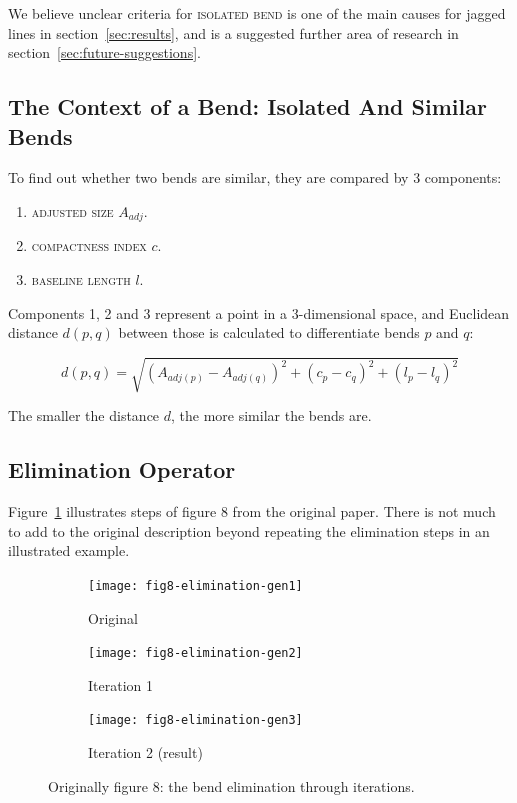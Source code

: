 \documentclass[a4paper]{article}
\begin{document}
We believe unclear criteria for \textsc{isolated bend} is one of the main
causes for jagged lines in section~\ref{sec:results}, and is a suggested
further area of research in section~\ref{sec:future-suggestions}.

\subsection{The Context of a Bend: Isolated And Similar Bends}

To find out whether two bends are similar, they are compared by 3 components:

\begin{enumerate}
  \item \textsc{adjusted size} $A_{adj}$.
  \item \textsc{compactness index} $c$.
  \item \textsc{baseline length} $l$.
\end{enumerate}

Components 1, 2 and 3 represent a point in a 3-dimensional space, and Euclidean
distance $d(p,q)$ between those is calculated to differentiate bends $p$ and
$q$:

\[
  d(p,q) = \sqrt{(A_{adj(p)}-A_{adj(q)})^2 +
                   (c_p-c_q)^2 +
                   (l_p-l_q)^2}
\]

The smaller the distance $d$, the more similar the bends are.

\clearpage
\subsection{Elimination Operator}

Figure~\ref{fig:elimination-through-iterations} illustrates steps of figure 8
from the original paper. There is not much to add to the original description
beyond repeating the elimination steps in an illustrated example.

\begin{figure}[ht]
    \centering
    \begin{subfigure}[b]{\textwidth}
        \texttt{[image: fig8-elimination-gen1]}
        \caption{Original}
    \end{subfigure}
    \begin{subfigure}[b]{\textwidth}
        \texttt{[image: fig8-elimination-gen2]}
        \caption{Iteration 1}
    \end{subfigure}
    \begin{subfigure}[b]{\textwidth}
        \texttt{[image: fig8-elimination-gen3]}
        \caption{Iteration 2 (result)}
    \end{subfigure}
    \caption{Originally figure 8: the bend elimination through iterations.}
    \label{fig:elimination-through-iterations}
\end{figure}
\end{document}
